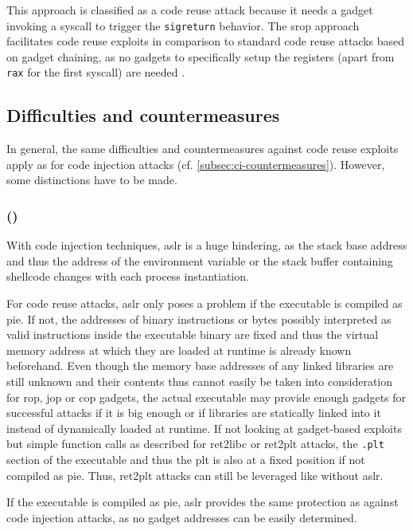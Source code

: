 This approach is classified as a code reuse attack because it needs a gadget invoking a \gls{syscall} to trigger the \texttt{sigreturn} behavior.
The \gls{srop} approach facilitates code reuse exploits in comparison to standard code reuse attacks based on gadget chaining, as no gadgets to specifically setup the registers (apart from \texttt{rax} for the first \gls{syscall}) are needed \cite{Bosman2014}.

\subsection{Difficulties and countermeasures}
\label{subsec:cr-countermeasures}

In general, the same difficulties and countermeasures against code reuse exploits apply as for code injection attacks (cf. \cref{subsec:ci-countermeasures}).
However, some distinctions have to be made.

\subsubsection{ ()}
\label{subsubsec:cr-aslr}

With code injection techniques, \gls{aslr} is a huge hindering, as the stack base address and thus the address of the environment variable or the stack buffer containing shellcode changes with each process instantiation.

For code reuse attacks, \gls{aslr} only poses a problem if the executable is compiled as \gls{pie}.
If not, the addresses of binary instructions or bytes possibly interpreted as valid instructions inside the executable binary are fixed and thus the virtual memory address at which they are loaded at runtime is already known beforehand.
Even though the memory base addresses of any linked libraries are still unknown and their contents thus cannot easily be taken into consideration for \gls{rop}, \gls{jop} or \gls{cop} gadgets, the actual executable may provide enough gadgets for successful attacks if it is big enough or if libraries are statically linked into it instead of dynamically loaded at runtime.
If not looking at gadget-based exploits but simple function calls as described for \gls{ret2libc} or \gls{ret2plt} attacks, the \texttt{.plt} section of the executable and thus the \gls{plt} is also at a fixed position if not compiled as \gls{pie}.
Thus, \gls{ret2plt} attacks can still be leveraged like without \gls{aslr}.

If the executable is compiled as \gls{pie}, \gls{aslr} provides the same protection as against code injection attacks, as no gadget addresses can be easily determined.

